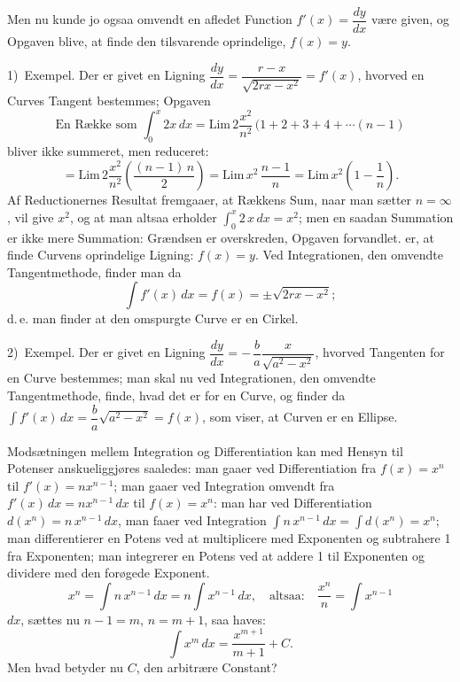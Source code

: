 \documentclass[12pt]{book}
\newcommand{\opage}[1]{\marginnote{\footnotesize\textit{[#1]}}}
\begin{document}
Men nu kunde jo ogsaa omvendt en afledet Function
$f'(x) = \dfrac{dy}{dx}$ være given, og Opgaven blive, at finde den
tilsvarende oprindelige, $f(x) = y$.

1)~Exempel. Der er givet en Ligning
$\dfrac{dy}{dx} = \dfrac{r-x}{\sqrt{2rx-x^{2}}} = f'(x)$, hvorved en
Curves Tangent bestemmes; Opgaven
\[
\text{En Række som }\int_{0}^{x} 2x\,dx
  = \mathrm{Lim}\,2\frac{x^{2}}{n^{2}}\,(1+2+3+4+\cdots (n-1)
\]
bliver ikke summeret, men reduceret:
\[
= \mathrm{Lim}\,2\frac{x^{2}}{n^{2}}\left(\frac{(n-1)\,n}{2}\right)
= \mathrm{Lim}\,x^{2}\,\frac{n-1}{n}
= \mathrm{Lim}\,x^{2}\left(1-\frac{1}{n}\right).
\]
Af Reductionernes Resultat fremgaaer, at Rækkens Sum, naar man
sætter $n = \infty$, vil give $x^{2}$, og at man altsaa erholder
$\int_{0}^{x} 2\,x\,dx = x^{2}$; men en saadan Summation er ikke mere
Summation: Grændsen er overskreden, Opgaven forvandlet.
\opage{74} er, at finde Curvens oprindelige Ligning: $f(x) = y$. Ved
Integrationen, den omvendte Tangentmethode, finder man da
\[
\int f'(x)\,dx = f(x) = \pm\sqrt{2rx-x^{2}};
\]
d.\,e. man finder at den omspurgte Curve er en Cirkel.

2)~Exempel. Der er givet en Ligning
$\dfrac{dy}{dx} = -\,\dfrac{b}{a}\dfrac{x}{\sqrt{a^{2}-x^{2}}}$,
hvorved Tangenten for en Curve bestemmes; man skal nu ved
Integrationen, den omvendte Tangentmethode, finde, hvad det er for
en Curve, og finder da
$\int f'(x)\,dx = \dfrac{b}{a}\sqrt{a^{2}-x^{2}} = f(x)$, som viser,
at Curven er en Ellipse.

Modsætningen mellem Integration og Differentiation kan med Hensyn
til Potenser anskueliggjøres saaledes: man gaaer ved Differentiation
fra $f(x) = x^{n}$ til $f'(x) = nx^{n-1}$; man gaaer ved Integration
omvendt fra $f'(x)\,dx = nx^{n-1}\,dx$ til $f(x) = x^{n}$: man har
ved Differentiation $d(x^{n}) = n\,x^{n-1}\,dx$, man faaer ved
Integration $\int n\,x^{n-1}\,dx = \int d(x^{n}) = x^{n}$; man
differentierer en Potens ved at multiplicere med Exponenten og
subtrahere 1 fra Exponenten; man integrerer en Potens ved at addere
1 til Exponenten og dividere med den forøgede Exponent.
\[
x^{n} = \int n\,x^{n-1}\,dx = n\int x^{n-1}\,dx, \quad\text{altsaa:}\quad
\frac{x^{n}}{n} = \int x^{n-1}
\]
$dx$, sættes nu $n-1 = m$, $n = m+1$, saa haves:
\[
\int x^{m}\,dx = \frac{x^{m+1}}{m+1} + C.
\]
Men hvad betyder nu $C$, den arbitrære Constant?
\end{document}

